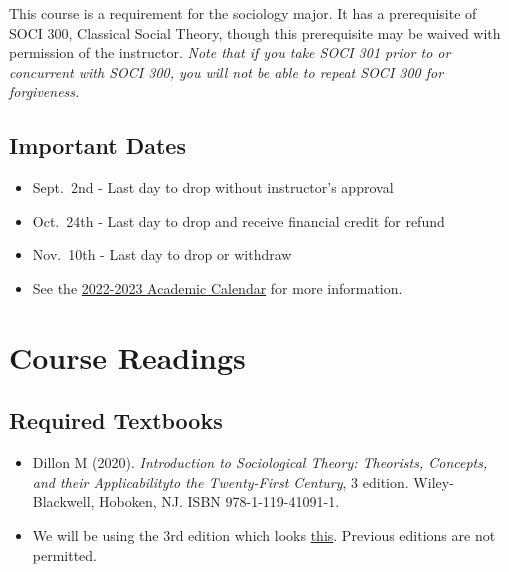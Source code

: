 \documentclass[11pt,]{article}
\providecommand{\tightlist}{%
  \setlength{\itemsep}{0pt}\setlength{\parskip}{0pt}}
\begin{document}
This course is a requirement for the sociology major. It has a
prerequisite of SOCI 300, Classical Social Theory, though this
prerequisite may be waived with permission of the instructor. \emph{Note
that if you take SOCI 301 prior to or concurrent with SOCI 300, you will
not be able to repeat SOCI 300 for forgiveness.}

\hypertarget{important-dates}{%
\subsection{Important Dates}\label{important-dates}}

\begin{itemize}
\tightlist
\item
  Sept.~2nd - Last day to drop without instructor's approval\\
\item
  Oct.~24th - Last day to drop and receive financial credit for refund\\
\item
  Nov.~10th - Last day to drop or withdraw\\
\item
  See the
  \href{https://www.csuchico.edu/apss/calendar/aca-cal-2022-23.shtml}{2022-2023
  Academic Calendar} for more information.
\end{itemize}

\hypertarget{course-readings}{%
\section{Course Readings}\label{course-readings}}

\hypertarget{required-textbooks}{%
\subsection{Required Textbooks}\label{required-textbooks}}

\begin{itemize}
\item
  Dillon M (2020). \emph{Introduction to Sociological Theory: Theorists,
  Concepts, and their Applicabilityto the Twenty-First Century}, 3
  edition. Wiley-Blackwell, Hoboken, NJ. ISBN 978-1-119-41091-1.
\item
  We will be using the 3rd edition which looks
  \href{https://www.abebooks.com/Introduction-Sociological-Theory-Theorists-Concepts-Applicability/31208296728/bd?cm_mmc=ggl-_-US_Shopp_Textbook-_-product_id=COM9781119410911USED-_-keyword=\&gclid=Cj0KCQjwuO6WBhDLARIsAIdeyDLJvr2N_LKW1qd-49HuMemlLuCRQT4yR3PKWnmeqMDWBDwy9LNFFRUaAlcyEALw_wcB}{this}.
  Previous editions are not permitted.
\end{itemize}
\end{document}
